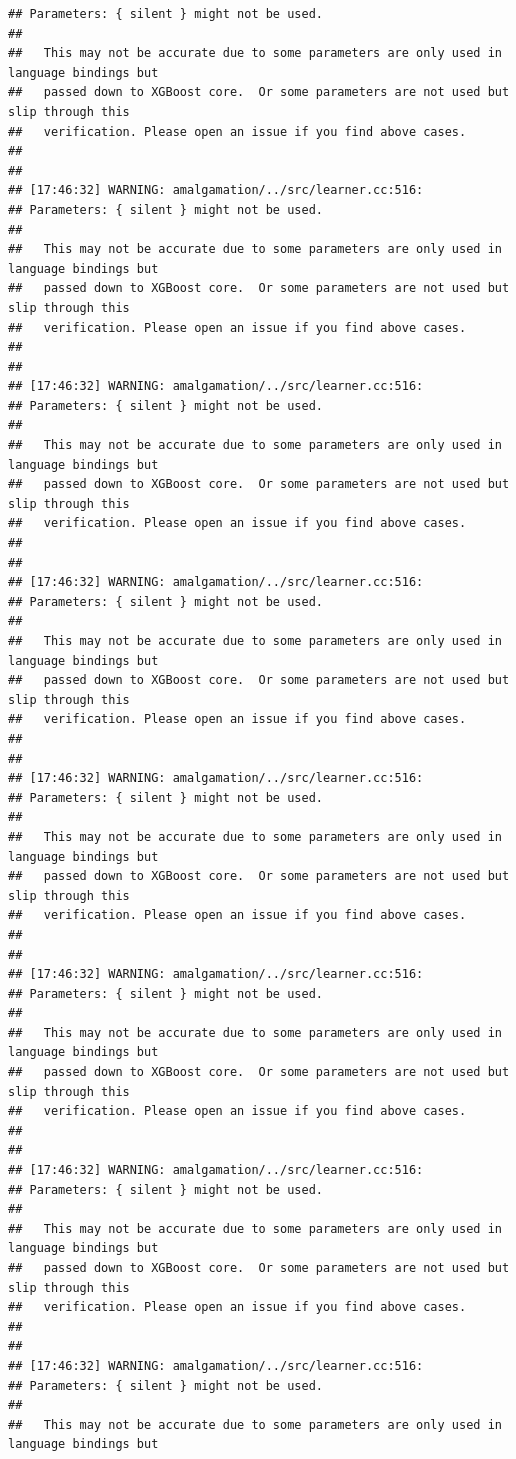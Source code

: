 \documentclass[AMS,STIX2COL]{WileyNJD-v2}\usepackage[]{graphicx}\usepackage[]{color}
\makeatletter
\newenvironment{kframe}{%
 \def\at@end@of@kframe{}%
 \ifinner\ifhmode%
  \def\at@end@of@kframe{\end{minipage}}%
  \begin{minipage}{\columnwidth}%
 \fi\fi%
 \def\FrameCommand##1{\hskip\@totalleftmargin \hskip-\fboxsep
 \colorbox{shadecolor}{##1}\hskip-\fboxsep
     \hskip-\linewidth \hskip-\@totalleftmargin \hskip\columnwidth}%
 \MakeFramed {\advance\hsize-\width
   \@totalleftmargin\z@ \linewidth\hsize
   \@setminipage}}%
 {\par\unskip\endMakeFramed%
 \at@end@of@kframe}
\newenvironment{knitrout}{}{} %
\makeatother
\begin{document}
\begin{knitrout}
\begin{kframe}
\begin{verbatim}
## Parameters: { silent } might not be used.
## 
##   This may not be accurate due to some parameters are only used in language bindings but
##   passed down to XGBoost core.  Or some parameters are not used but slip through this
##   verification. Please open an issue if you find above cases.
## 
## 
## [17:46:32] WARNING: amalgamation/../src/learner.cc:516: 
## Parameters: { silent } might not be used.
## 
##   This may not be accurate due to some parameters are only used in language bindings but
##   passed down to XGBoost core.  Or some parameters are not used but slip through this
##   verification. Please open an issue if you find above cases.
## 
## 
## [17:46:32] WARNING: amalgamation/../src/learner.cc:516: 
## Parameters: { silent } might not be used.
## 
##   This may not be accurate due to some parameters are only used in language bindings but
##   passed down to XGBoost core.  Or some parameters are not used but slip through this
##   verification. Please open an issue if you find above cases.
## 
## 
## [17:46:32] WARNING: amalgamation/../src/learner.cc:516: 
## Parameters: { silent } might not be used.
## 
##   This may not be accurate due to some parameters are only used in language bindings but
##   passed down to XGBoost core.  Or some parameters are not used but slip through this
##   verification. Please open an issue if you find above cases.
## 
## 
## [17:46:32] WARNING: amalgamation/../src/learner.cc:516: 
## Parameters: { silent } might not be used.
## 
##   This may not be accurate due to some parameters are only used in language bindings but
##   passed down to XGBoost core.  Or some parameters are not used but slip through this
##   verification. Please open an issue if you find above cases.
## 
## 
## [17:46:32] WARNING: amalgamation/../src/learner.cc:516: 
## Parameters: { silent } might not be used.
## 
##   This may not be accurate due to some parameters are only used in language bindings but
##   passed down to XGBoost core.  Or some parameters are not used but slip through this
##   verification. Please open an issue if you find above cases.
## 
## 
## [17:46:32] WARNING: amalgamation/../src/learner.cc:516: 
## Parameters: { silent } might not be used.
## 
##   This may not be accurate due to some parameters are only used in language bindings but
##   passed down to XGBoost core.  Or some parameters are not used but slip through this
##   verification. Please open an issue if you find above cases.
## 
## 
## [17:46:32] WARNING: amalgamation/../src/learner.cc:516: 
## Parameters: { silent } might not be used.
## 
##   This may not be accurate due to some parameters are only used in language bindings but

\end{verbatim}
\end{kframe}
\end{knitrout}
\end{document}
